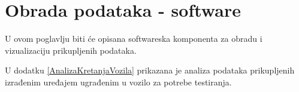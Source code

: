 \chapter{Obrada podataka - software}
U ovom poglavlju biti će opisana softwareska komponenta za obradu i vizualizaciju prikupljenih podataka.

U dodatku \ref{AnalizaKretanjaVozila} prikazana je analiza podataka prikupljenih izrađenim uređajem ugrađenim u vozilo za potrebe testiranja.